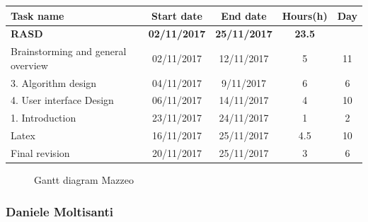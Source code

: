 \begin{table}[h!]
	\begin{tabular}{lcccc}
		\toprule
		\textbf{Task name} & \textbf{Start date} & \textbf{End date} & \textbf{Hours(h)} & \textbf{Day} \\
		\midrule
		\textbf{RASD} & \textbf{02/11/2017} & \textbf{25/11/2017} & \textbf{23.5} &  \\
		Brainstorming and general overview & 02/11/2017 & 12/11/2017 & 5 & 11 \\
		3. Algorithm design & 04/11/2017 & 9/11/2017 & 6 & 6 \\
		4. User interface Design & 06/11/2017 & 14/11/2017 & 4 & 10 \\
		1. Introduction & 23/11/2017 & 24/11/2017 & 1 & 2 \\
		Latex & 16/11/2017 & 25/11/2017 & 4.5 & 10 \\
		\bottomrule
		Final revision & 20/11/2017 & 25/11/2017 & 3 & 6 \\
	\end{tabular}
\end{table}

\begin{figure}[!h]
	\centering
	\caption{Gantt diagram Mazzeo}
\end{figure}
\clearpage

\subsubsection{Daniele Moltisanti}

